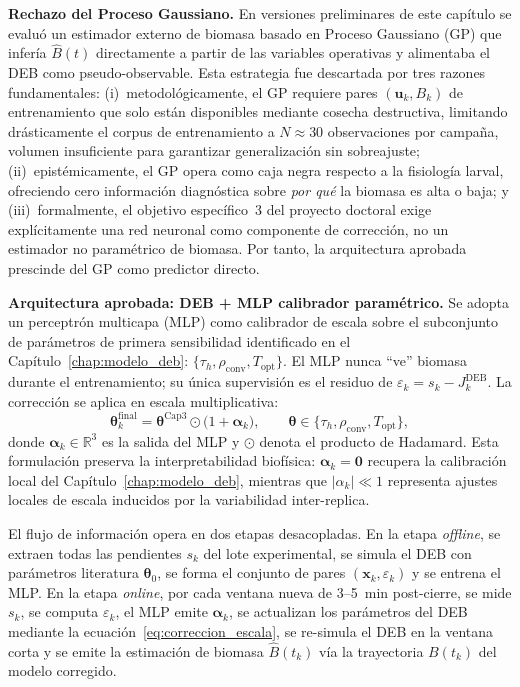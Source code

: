 \textbf{Rechazo del Proceso Gaussiano.} En versiones preliminares de este capítulo se evaluó un estimador externo de biomasa basado en Proceso Gaussiano (GP) que infería $\hat{B}(t)$ directamente a partir de las variables operativas y alimentaba el DEB como pseudo-observable. Esta estrategia fue descartada por tres razones fundamentales: (i)~metodológicamente, el GP requiere pares $(\mathbf{u}_k, B_k)$ de entrenamiento que solo están disponibles mediante cosecha destructiva, limitando drásticamente el corpus de entrenamiento a $N \approx 30$ observaciones por campaña, volumen insuficiente para garantizar generalización sin sobreajuste; (ii)~epistémicamente, el GP opera como caja negra respecto a la fisiología larval, ofreciendo cero información diagnóstica sobre \emph{por qué} la biomasa es alta o baja; y (iii)~formalmente, el objetivo específico~3 del proyecto doctoral exige explícitamente una red neuronal como componente de corrección, no un estimador no paramétrico de biomasa. Por tanto, la arquitectura aprobada prescinde del GP como predictor directo.

\textbf{Arquitectura aprobada: DEB + MLP calibrador paramétrico.} Se adopta un perceptrón multicapa (MLP) como calibrador de escala sobre el subconjunto de parámetros de primera sensibilidad identificado en el Capítulo~\ref{chap:modelo_deb}: $\{\tau_h, \rho_{\mathrm{conv}}, T_{\mathrm{opt}}\}$. El MLP nunca ``ve'' biomasa durante el entrenamiento; su única supervisión es el residuo de  $\varepsilon_k = s_k - J_k^{\mathrm{DEB}}$. La corrección se aplica en escala multiplicativa:
\begin{equation}
\boldsymbol{\theta}_k^{\mathrm{final}} = \boldsymbol{\theta}^{\mathrm{Cap3}} \odot \bigl(1 + \boldsymbol{\alpha}_k\bigr),
\qquad
\boldsymbol{\theta} \in \{\tau_h, \rho_{\mathrm{conv}}, T_{\mathrm{opt}}\},
\label{eq:correccion_escala}
\end{equation}
donde $\boldsymbol{\alpha}_k \in \mathbb{R}^3$ es la salida del MLP y $\odot$ denota el producto de Hadamard. Esta formulación preserva la interpretabilidad biofísica: $\boldsymbol{\alpha}_k = \mathbf{0}$ recupera la calibración local del Capítulo~\ref{chap:modelo_deb}, mientras que $|\alpha_k| \ll 1$ representa ajustes locales de escala inducidos por la variabilidad inter-replica.

El flujo de información opera en dos etapas desacopladas. En la etapa \emph{offline}, se extraen todas las pendientes $s_k$ del lote experimental, se simula el DEB con parámetros literatura $\boldsymbol{\theta}_0$, se forma el conjunto de pares $(\mathbf{x}_k, \varepsilon_k)$ y se entrena el MLP. En la etapa \emph{online}, por cada ventana nueva de 3--5~min post-cierre, se mide $s_k$, se computa $\varepsilon_k$, el MLP emite $\boldsymbol{\alpha}_k$, se actualizan los parámetros del DEB mediante la ecuación~\eqref{eq:correccion_escala}, se re-simula el DEB en la ventana corta y se emite la estimación de biomasa $\hat{B}(t_k)$ vía la trayectoria $B(t_k)$ del modelo corregido.

